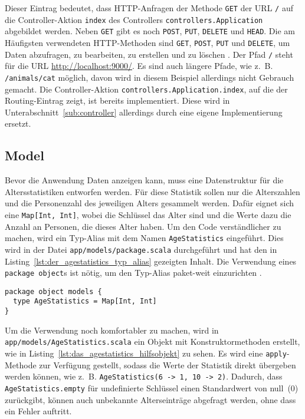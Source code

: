 Dieser Eintrag bedeutet, dass HTTP-Anfragen der Methode \lstinline|GET| der URL \lstinline|/| auf die Controller-Aktion \lstinline|index| des Controllers \lstinline[breaklines=true]|controllers.Application| abgebildet werden.
Neben \lstinline|GET| gibt es noch \lstinline|POST|, \lstinline|PUT|, \lstinline|DELETE| und \lstinline|HEAD|.
Die am Häufigsten verwendeten HTTP-Methoden sind \lstinline|GET|, \lstinline|POST|, \lstinline|PUT| und \lstinline|DELETE|, um Daten abzufragen, zu bearbeiten, zu erstellen und zu löschen \cite[vgl.][S.~7]{play_for_scala}.
Der Pfad \lstinline|/| steht für die URL \url{http://localhost:9000/}.
Es sind auch längere Pfade, wie z.~B. \lstinline|/animals/cat| möglich, davon wird in diesem Beispiel allerdings nicht Gebrauch gemacht.
Die Controller-Aktion \lstinline|controllers.Application.index|, auf die der Routing-Eintrag zeigt, ist bereits implementiert.
Diese wird in Unterabschnitt~\ref{sub:controller} allerdings durch eine eigene Implementierung ersetzt.



\subsection{Model} %
\label{sub:model}

Bevor die Anwendung Daten anzeigen kann, muss eine Datenstruktur für die Altersstatistiken entworfen werden.
Für diese Statistik sollen nur die Alterszahlen und die Personenzahl des jeweiligen Alters gesammelt werden.
Dafür eignet sich eine \lstinline|Map[Int, Int]|, wobei die Schlüssel das Alter sind und die Werte dazu die Anzahl an Personen, die dieses Alter haben.
Um den Code verständlicher zu machen, wird ein Typ-Alias mit dem Namen \lstinline|AgeStatistics| eingeführt.
Dies wird in der Datei \lstinline[language=sh]|app/models/package.scala| durchgeführt und hat den in Listing~\ref{lst:der_agestatistics_typ_alias} gezeigten Inhalt.
Die Verwendung eines \lstinline|package object|s ist nötig, um den Typ-Alias paket-weit einzurichten \cite[vgl.][]{package_objects}.

\begin{lstlisting}[caption=Der AgeStatistics-Typ-Alias, label=lst:der_agestatistics_typ_alias]
package object models {
  type AgeStatistics = Map[Int, Int]
}
\end{lstlisting}

Um die Verwendung noch komfortabler zu machen, wird in \lstinline|app/models/AgeStatistics.scala| ein Objekt mit Konstruktormethoden erstellt, wie in Listing~\ref{lst:das_agestatistics_hilfsobjekt} zu sehen.
Es wird eine \lstinline|apply|-Methode zur Verfügung gestellt, sodass die Werte der Statistik direkt übergeben werden können, wie z.~B. \lstinline|AgeStatistics(6 -> 1, 10 -> 2)|.
Dadurch, dass \lstinline|AgeStatistics.empty| für undefinierte Schlüssel einen Standardwert von null~(0) zurückgibt, können auch unbekannte Alterseinträge abgefragt werden, ohne dass ein Fehler auftritt.

